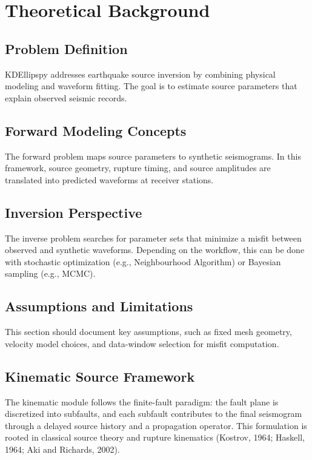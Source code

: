 \chapter{Theoretical Background}

\section{Problem Definition}
KDEllipspy addresses earthquake source inversion by combining physical modeling and waveform fitting.
The goal is to estimate source parameters that explain observed seismic records.

\section{Forward Modeling Concepts}
The forward problem maps source parameters to synthetic seismograms.
In this framework, source geometry, rupture timing, and source amplitudes are translated into predicted waveforms at receiver stations.

\section{Inversion Perspective}
The inverse problem searches for parameter sets that minimize a misfit between observed and synthetic waveforms.
Depending on the workflow, this can be done with stochastic optimization (e.g., Neighbourhood Algorithm) or Bayesian sampling (e.g., MCMC).

\section{Assumptions and Limitations}
This section should document key assumptions, such as fixed mesh geometry, velocity model choices, and data-window selection for misfit computation.

\section{Kinematic Source Framework}
The kinematic module follows the finite-fault paradigm: the fault plane is discretized into subfaults, and each subfault contributes to the final seismogram through a delayed source history and a propagation operator.
This formulation is rooted in classical source theory and rupture kinematics (Kostrov, 1964; Haskell, 1964; Aki and Richards, 2002).

